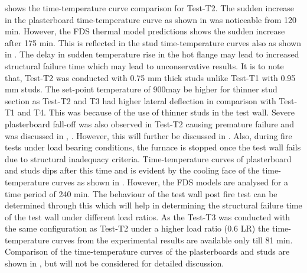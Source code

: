  shows the time-temperature curve comparison for Test-T2. The sudden increase in the plasterboard time-temperature curve as shown in  was noticeable from 120 min. However, the FDS thermal model predictions shows the sudden increase after 175 min. This is reflected in the stud time-temperature curves also as shown in . The delay in sudden temperature rise in the hot flange may lead to increased structural failure time which may lead to unconservative results. It is to note that, Test-T2 was conducted with 0.75 mm thick studs unlike Test-T1 with 0.95 mm studs. The set-point temperature of 900\degree may be higher for thinner stud section as Test-T2 and T3 had higher lateral deflection in comparison with Test-T1 and T4. This was because of the use of thinner studs in the test wall. Severe plasterboard fall-off was also observed in Test-T2 causing premature failure and was discussed in , . However, this will further be discussed in . Also, during fire tests under load bearing conditions, the furnace is stopped once the test wall fails due to structural inadequacy criteria. Time-temperature curves of plasterboard and studs dips after this time and is evident by the cooling face of the time-temperature curves as shown in . However, the FDS models are analysed for a time period of 240 min. The behaviour of the test wall post fire test can be determined through this which will help in determining the structural failure time of the test wall under different load ratios. As the Test-T3 was conducted with the same configuration as Test-T2 under a higher load ratio (0.6 LR) the time-temperature curves from the experimental results are available only till 81 min. Comparison of the time-temperature curves of the plasterboards and studs are shown in , but will not be considered for detailed discussion.  

